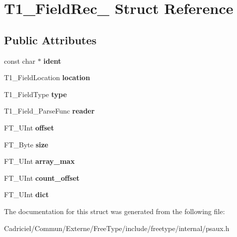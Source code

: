 \hypertarget{struct_t1___field_rec__}{}\section{T1\+\_\+\+Field\+Rec\+\_\+ Struct Reference}
\label{struct_t1___field_rec__}
\subsection*{Public Attributes}
\begin{DoxyCompactItemize}
\item 
const char $\ast$ {\bfseries ident}\hypertarget{struct_t1___field_rec___aaf70ae870eff9ea2b0518ef5e7301cfd}{}\label{struct_t1___field_rec___aaf70ae870eff9ea2b0518ef5e7301cfd}

\item 
T1\+\_\+\+Field\+Location {\bfseries location}\hypertarget{struct_t1___field_rec___a1e17111c68df523f82d20bddd822ca4d}{}\label{struct_t1___field_rec___a1e17111c68df523f82d20bddd822ca4d}

\item 
T1\+\_\+\+Field\+Type {\bfseries type}\hypertarget{struct_t1___field_rec___ad873155b36b72db9a1feaf2699fed1ce}{}\label{struct_t1___field_rec___ad873155b36b72db9a1feaf2699fed1ce}

\item 
T1\+\_\+\+Field\+\_\+\+Parse\+Func {\bfseries reader}\hypertarget{struct_t1___field_rec___a95e227de47c22bdadd77f797ff43d89d}{}\label{struct_t1___field_rec___a95e227de47c22bdadd77f797ff43d89d}

\item 
F\+T\+\_\+\+U\+Int {\bfseries offset}\hypertarget{struct_t1___field_rec___a41b503016f68291e061a2e29498982c1}{}\label{struct_t1___field_rec___a41b503016f68291e061a2e29498982c1}

\item 
F\+T\+\_\+\+Byte {\bfseries size}\hypertarget{struct_t1___field_rec___a8ce74a7ad2276abe8942883e7fbb1241}{}\label{struct_t1___field_rec___a8ce74a7ad2276abe8942883e7fbb1241}

\item 
F\+T\+\_\+\+U\+Int {\bfseries array\+\_\+max}\hypertarget{struct_t1___field_rec___a87f063bd3ad0dcfa30c00946d9f9cae8}{}\label{struct_t1___field_rec___a87f063bd3ad0dcfa30c00946d9f9cae8}

\item 
F\+T\+\_\+\+U\+Int {\bfseries count\+\_\+offset}\hypertarget{struct_t1___field_rec___a41d8814cc651d0276f8cfad751721326}{}\label{struct_t1___field_rec___a41d8814cc651d0276f8cfad751721326}

\item 
F\+T\+\_\+\+U\+Int {\bfseries dict}\hypertarget{struct_t1___field_rec___a509f7ddb1e0ffe050017daa29223e224}{}\label{struct_t1___field_rec___a509f7ddb1e0ffe050017daa29223e224}

\end{DoxyCompactItemize}


The documentation for this struct was generated from the following file\+:\begin{DoxyCompactItemize}
\item 
Cadriciel/\+Commun/\+Externe/\+Free\+Type/include/freetype/internal/psaux.\+h\end{DoxyCompactItemize}
